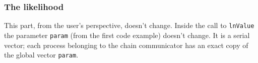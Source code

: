 \documentclass{article}
\newcommand{\Queso}{\texttt{QUESO}}
\begin{document}
\subsubsection{The likelihood}

This part, from the user's perspective, doesn't change.  Inside the call to
\lstinline|lnValue| the parameter \lstinline|param| (from the first code
example) doesn't change.  It is a serial vector; each process belonging to the
chain communicator has an exact copy of the global vector \lstinline|param|.

\end{document}
